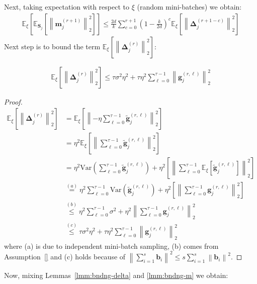 Next, taking expectation with respect to $\xi$ (random mini-batches) we obtain:
\begin{align}
    \mathbb{E}_{\xi}\left[\mathbb{E}_{\mathbf{S}_j}\left[\left\|\mathbf{m}_j^{(r+1)}\right\|^2_2\right]\right]\leq \frac{2d}{k}\sum_{c=0}^{r+1}\left(1-\frac{k}{2d}\right)^{c}\mathbb{E}_{\xi}\left[\left\|\mathbf{\Delta}_j^{(r+1-c)}\right\|_2^2 \right]
\end{align}
Next step is to bound the term $\mathbb{E}_{\xi}\left[\left\|\mathbf{\Delta}_j^{(r)}\right\|_2^2 \right]$:
\begin{lemma}\label{lmm:bndng-delta}
\begin{align}
    \mathbb{E}_{\xi}\left[\left\|\mathbf{\Delta}_j^{(r)}\right\|_2^2 \right]\leq\tau\sigma^2\eta^2+\tau\eta^2\sum_{\ell=0}^{\tau-1}\left\|{\mathbf{g}}_j^{(r,\ell)}\right\|_2^2
\end{align}
\end{lemma}
\begin{proof}
\begin{align}
    \mathbb{E}_{\xi}\left[\left\|\mathbf{\Delta}_j^{(r)}\right\|_2^2 \right]&=\mathbb{E}_{\xi}\left[\left\|-\eta\sum_{\ell=0}^{\tau-1}\tilde{\mathbf{g}}_j^{(r,\ell)}\right\|_2^2 \right]\nonumber\\
    &=\eta^2\mathbb{E}_{\xi}\left[\left\|\sum_{\ell=0}^{\tau-1}\tilde{\mathbf{g}}_j^{(r,\ell)}\right\|_2^2 \right]\nonumber\\
    &=\eta^2 \text{Var}\left(\sum_{\ell=0}^{\tau-1}\tilde{\mathbf{g}}_j^{(r,\ell)}\right)+\eta^2\left[\left\|\sum_{\ell=0}^{\tau-1}\mathbb{E}_{\xi}\left[\tilde{\mathbf{g}}_j^{(r,\ell)}\right]\right\|_2^2 \right]\nonumber\\
    &\stackrel{(a)}{=}\eta^2 \sum_{\ell=0}^{\tau-1}\text{Var}\left(\tilde{\mathbf{g}}_j^{(r,\ell)}\right)+\eta^2\left[\left\|\sum_{\ell=0}^{\tau-1}{\mathbf{g}}_j^{(r,\ell)}\right\|_2^2 \right]\nonumber\\
        &\stackrel{(b)}{\leq}\eta^2 \sum_{\ell=0}^{\tau-1}\sigma^2+\eta^2\left\|\sum_{\ell=0}^{\tau-1}{\mathbf{g}}_j^{(r,\ell)}\right\|_2^2 \nonumber\\
        &\stackrel{(c)}{\leq} \tau\sigma^2\eta^2+\tau\eta^2\sum_{\ell=0}^{\tau-1}\left\|{\mathbf{g}}_j^{(r,\ell)}\right\|_2^2 
\end{align}
where (a) is due to independent mini-batch sampling, (b) comes from Assumption~\ref{} and (c) holds because of $\left\|\sum_{i=1}^s\mathbf{b}_i\right\|^2\leq s\sum_{i=1}^s\left\|\mathbf{b}_i\right\|^2$.
\end{proof}
Now, mixing Lemmas~\ref{lmm:bndng-delta} and \ref{lmm:bndng-m} we obtain:
